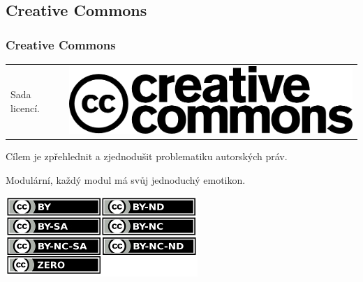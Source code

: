 \documentclass[xetex]{beamer}
\begin{document}
\subsection{Creative Commons}
\begin{frame}
	\frametitle{Creative Commons}
	\begin{tabular}{l r}
	Sada licencí. &\hspace{2.5cm}\includegraphics[scale=0.85]{images/cc.logo.png}\\
	\end{tabular}

	\medskip

	Cílem je zpřehlednit a zjednodušit problematiku autorských práv.

	\medskip

	Modulární, každý modul má svůj jednoduchý emotikon.

	\medskip

	\begin{center}
	\includegraphics[scale=0.7]{images/cc-types.jpg}
	\end{center}
\end{frame}
\end{document}
